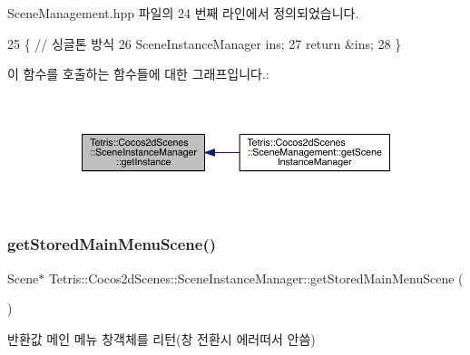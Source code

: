 Scene\+Management.\+hpp 파일의 24 번째 라인에서 정의되었습니다.


\begin{DoxyCode}
25         \{ \textcolor{comment}{// 싱글톤 방식}
26                 SceneInstanceManager ins;
27                 \textcolor{keywordflow}{return} &ins;
28             \}
\end{DoxyCode}
이 함수를 호출하는 함수들에 대한 그래프입니다.\+:
\nopagebreak
\begin{figure}[H]
\begin{center}
\leavevmode
\includegraphics[width=350pt]{d1/d6f/class_tetris_1_1_cocos2d_scenes_1_1_scene_instance_manager_a0010e1efc6470cde661494631dc35b90_icgraph}
\end{center}
\end{figure}
\mbox{\label{class_tetris_1_1_cocos2d_scenes_1_1_scene_instance_manager_ac7f573b16a4fd8746fd1f397dbfd01c2}} 
\subsubsection{\texorpdfstring{get\+Stored\+Main\+Menu\+Scene()}{getStoredMainMenuScene()}}
{\footnotesize\ttfamily Scene$\ast$ Tetris\+::\+Cocos2d\+Scenes\+::\+Scene\+Instance\+Manager\+::get\+Stored\+Main\+Menu\+Scene (\begin{DoxyParamCaption}{ }\end{DoxyParamCaption})\hspace{0.3cm}{\ttfamily [inline]}}

\begin{DoxyReturn}{반환값}
메인 메뉴 창객체를 리턴(창 전환시 에러떠서 안씀) 
\end{DoxyReturn}


